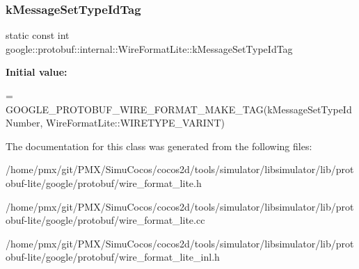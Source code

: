\subsubsection{\texorpdfstring{k\+Message\+Set\+Type\+Id\+Tag}{kMessageSetTypeIdTag}}
{\footnotesize\ttfamily static const int google\+::protobuf\+::internal\+::\+Wire\+Format\+Lite\+::k\+Message\+Set\+Type\+Id\+Tag\hspace{0.3cm}{\ttfamily [static]}}

{\bfseries Initial value\+:}
\begin{DoxyCode}
=
    GOOGLE\_PROTOBUF\_WIRE\_FORMAT\_MAKE\_TAG(kMessageSetTypeIdNumber,
                                WireFormatLite::WIRETYPE\_VARINT)
\end{DoxyCode}


The documentation for this class was generated from the following files\+:\begin{DoxyCompactItemize}
\item 
/home/pmx/git/\+P\+M\+X/\+Simu\+Cocos/cocos2d/tools/simulator/libsimulator/lib/protobuf-\/lite/google/protobuf/wire\+\_\+format\+\_\+lite.\+h\item 
/home/pmx/git/\+P\+M\+X/\+Simu\+Cocos/cocos2d/tools/simulator/libsimulator/lib/protobuf-\/lite/google/protobuf/wire\+\_\+format\+\_\+lite.\+cc\item 
/home/pmx/git/\+P\+M\+X/\+Simu\+Cocos/cocos2d/tools/simulator/libsimulator/lib/protobuf-\/lite/google/protobuf/wire\+\_\+format\+\_\+lite\+\_\+inl.\+h\end{DoxyCompactItemize}
